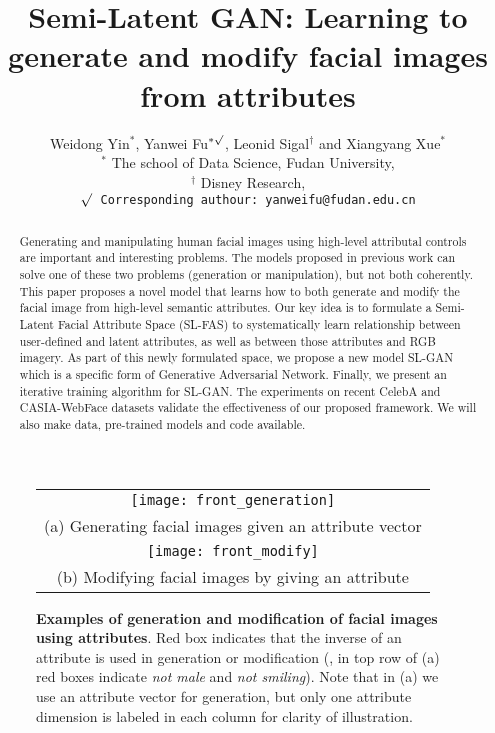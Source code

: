 \documentclass[10pt,letterpaper,twocolumn]{article}
\providecommand{\tabularnewline}{\\}
\begin{document}
\title{Semi-Latent GAN: Learning to generate and modify facial images from
attributes}

\author{Weidong Yin$^{*}$, Yanwei Fu$^{*\surd}$, Leonid Sigal$^{\dagger}$ and Xiangyang Xue$^{*}$ \\
$^{*}$ The school of Data Science, Fudan University, \\
$^{\dagger}$ Disney Research, \\
{\tt\small $\surd$ Corresponding authour: yanweifu@fudan.edu.cn}
}

\maketitle
\begin{abstract}
Generating and manipulating human facial images using high-level attributal
controls are important and interesting problems. The models proposed
in previous work can solve one of these two problems (generation or
manipulation), but not both coherently. This paper proposes a novel
model that learns how to both generate and modify the facial image
from high-level semantic attributes. Our key idea is to formulate
a Semi-Latent Facial Attribute Space (SL-FAS) to systematically learn
relationship between user-defined and latent attributes, as well as
between those attributes and RGB imagery. As part of this newly formulated
space, we propose a new model \textendash{} SL-GAN which is a specific
form of Generative Adversarial Network. Finally, we present an iterative
training algorithm for SL-GAN. The experiments on recent CelebA and
CASIA-WebFace datasets validate the effectiveness of our proposed
framework. We will also make data, pre-trained models and code available. 
\end{abstract}
\begin{figure}
\centering{}%
\begin{tabular}{c}
\texttt{[image: front\_generation]}\tabularnewline{\small{}{}(a) Generating facial images given an attribute vector}\tabularnewline
\texttt{[image: front\_modify]}\tabularnewline{\small{}{}(b) Modifying facial images by giving an attribute}\tabularnewline
\end{tabular}\caption{\label{fig:Facial-attribute-editing}\textbf{Examples of generation
and modification of facial images using attributes}. Red box indicates
that the inverse of an attribute is used in generation or modification
(\eg, in top row of (a) red boxes indicate {\em not male} and
{\em not smiling}). Note that in (a) we use an attribute vector
for generation, but only one attribute dimension is labeled in each
column for clarity of illustration. }
\vspace{-0.05in}
 
\end{figure}
\end{document}
